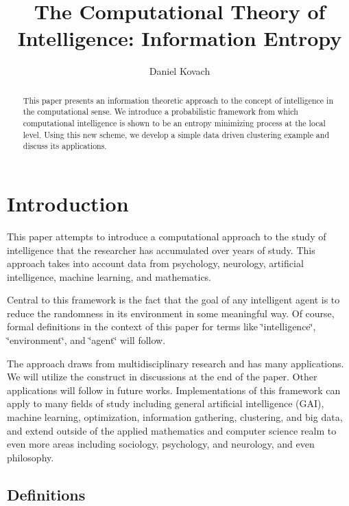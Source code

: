 \documentclass[english]{article}
\begin{document}
\title{The Computational Theory of Intelligence: Information Entropy}


\author{Daniel Kovach}
\maketitle
\begin{abstract}
This paper presents an information theoretic approach to the concept
of intelligence in the computational sense. We introduce a probabilistic
framework from which computational intelligence is shown to be an
entropy minimizing process at the local level. Using this new scheme,
we develop a simple data driven clustering example and discuss its
applications.
\end{abstract}

\section{Introduction}

This paper attempts to introduce a computational approach to the study
of intelligence that the researcher has accumulated over years of
study. This approach takes into account data from psychology, neurology,
artificial intelligence, machine learning, and mathematics. 

Central to this framework is the fact that the goal of any intelligent
agent is to reduce the randomness in its environment in some meaningful
way. Of course, formal definitions in the context of this paper for
terms like \char`\"{}intelligence\char`\"{}, \char`\"{}environment\char`\"{},
and \char`\"{}agent\char`\"{} will follow.

The approach draws from multidisciplinary research and has many applications.
We will utilize the construct in discussions at the end of the paper.
Other applications will follow in future works. Implementations of
this framework can apply to many fields of study including general
artificial intelligence (GAI), machine learning, optimization, information
gathering, clustering, and big data, and extend outside of the applied
mathematics and computer science realm to even more areas including
sociology, psychology, and neurology, and even philosophy.


\subsection{Definitions}
\end{document}
